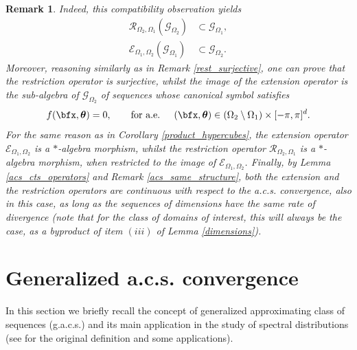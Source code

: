 \documentclass{amsart}
\newtheorem{rem}[thm]{Remark}
\newcommand{\bftheta}{{\boldsymbol\theta}}
\begin{document}
\begin{rem}
Indeed, this compatibility observation yields
\begin{align*}
    \mathcal{R}_{\Omega_2,\Omega_1}(\mathcal{G}_{\Omega_2})&\subset\mathcal{G}_{\Omega_1},\\
    \mathcal{E}_{\Omega_1,\Omega_2}(\mathcal{G}_{\Omega_1})&\subset\mathcal{G}_{\Omega_2}.
\end{align*}
Moreover, reasoning similarly as in Remark \ref{rest_surjective}, one can prove that the restriction operator is surjective, whilst the image of the extension operator is the sub-algebra of $\mathcal{G}_{\Omega_2}$ of sequences whose canonical symbol satisfies 
\begin{equation*}
        f(\bfx,\bftheta)=0,\qquad \text{for a.e. }\quad(\bfx,\bftheta)\in (\Omega_2\setminus \Omega_1)\times[-\pi,\pi]^d.
    \end{equation*}
For the same reason as in Corollary \ref{product_hypercubes}, the extension operator $\mathcal{E}_{\Omega_1,\Omega_2}$ is a $*$-algebra morphism, whilst the restriction operator $\mathcal{R}_{\Omega_2,\Omega_1}$ is a $*$-algebra morphism, when restricted to the image of $\mathcal{E}_{\Omega_1,\Omega_2}$.
Finally, by Lemma \ref{acs_cts_operators} and Remark \ref{acs_same_structure}, both the extension and the restriction operators are continuous with respect to the a.c.s. convergence, also in this case, as long as the sequences of dimensions have the same rate of divergence (note that for the class of domains of interest, this will always be the case, as a byproduct of item $(iii)$ of Lemma \ref{dimensions}).
\end{rem}


\section{Generalized a.c.s. convergence}\label{sec-gacs}


In this section we briefly recall the concept of generalized approximating class of sequences (g.a.c.s.) and its main application in the study of spectral distributions (see \cite{gacs} for the original definition and some applications).
\end{document}
